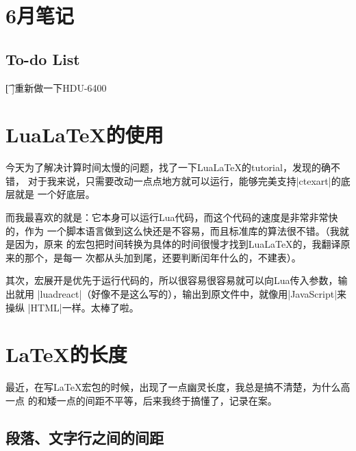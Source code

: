 
\section{6月笔记}


\subsection{To-do List}

\begin{plttodoenv}{3}
\t[ ]重新做一下HDU-6400
\end{plttodoenv}


\section{Lua\LaTeX{}的使用}

今天为了解决计算时间太慢的问题，找了一下Lua\LaTeX{}的tutorial，发现的确不错，
对于我来说，只需要改动一点点地方就可以运行，能够完美支持\vb|ctexart|的底层就是
一个好底层。

而我最喜欢的就是：它本身可以运行Lua代码，而这个代码的速度是非常非常快的，作为
一个脚本语言做到这么快还是不容易，而且标准库的算法很不错。（我就是因为，原来
的宏包把时间转换为具体的时间很慢才找到Lua\LaTeX{}的，我翻译原来的那个，是每一
次都从头加到尾，还要判断闰年什么的，不建表）。

其次，宏展开是优先于运行代码的，所以很容易很容易就可以向Lua传入参数，输出就用%
\vb|luadreact|（好像不是这么写的），输出到原文件中，就像用\vb|JavaScript|来操纵%
\vb|HTML|一样。太棒了啦。


\section{\LaTeX{}的长度}

最近，在写\LaTeX{}宏包的时候，出现了一点幽灵长度，我总是搞不清楚，为什么高一点
的和矮一点的间距不平等，后来我终于搞懂了，记录在案。

\subsection{段落、文字行之间的间距}

